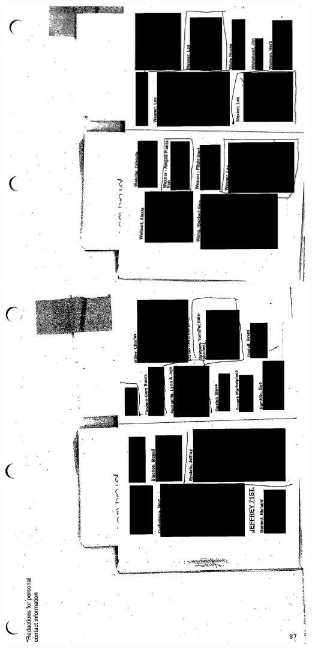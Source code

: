\documentclass[10pt]{article}
\begin{document}
\includegraphics[max width=\textwidth, center]{2025_02_27_dd68c3d38de88f0516d9g-203}\\
\includegraphics[max width=\textwidth, center]{2025_02_27_dd68c3d38de88f0516d9g-204}\\
\end{document}
